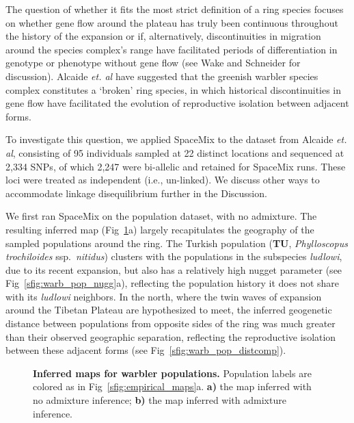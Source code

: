 \documentclass[10pt,letterpaper]{article}
\begin{document}
The question of whether it fits the most strict definition of a ring species focuses on whether gene flow around the plateau has truly been continuous throughout the history of the expansion or if, alternatively, discontinuities in migration around the species complex's range have facilitated periods of differentiation in genotype or phenotype without gene flow \cite{Mayr1942, Mayr1970, coyne_orr_speciation} (see Wake and Schneider \cite{wake_schneider1998} for discussion). 
Alcaide \emph{et. al} \cite{alcaide2014genomic} have suggested that the greenish warbler species complex constitutes a `broken' ring species, in which historical discontinuities in gene flow have facilitated the evolution of reproductive isolation between adjacent forms.  

To investigate this question, we applied SpaceMix to the dataset from Alcaide \emph{et. al}\cite{alcaide2014genomic}, 
consisting of 95 individuals sampled at 22 distinct locations and sequenced at 2,334 SNPs, of which 2,247 were bi-allelic and retained for SpaceMix runs.  These loci were treated as independent (i.e., un-linked).  We discuss other ways to accommodate linkage disequilibrium further in the Discussion.

We first ran SpaceMix on the population dataset, with no admixture. The resulting inferred map (Fig\ \ref{sfig:warbler_pop}a) largely recapitulates the geography of the sampled populations around the ring.  The Turkish population (\textbf{TU}, \textit{Phylloscopus trochiloides} ssp.\ \textit{nitidus}) clusters with the populations in the subspecies \textit{ludlowi}, due to its recent expansion, but also has a relatively high nugget parameter (see Fig\ \ref{sfig:warb_pop_nugg}a), reflecting the population history it does not share with its \textit{ludlowi} neighbors.  In the north, where the twin waves of expansion around the Tibetan Plateau are hypothesized to meet, the inferred geogenetic distance between populations from opposite sides of the ring was much greater than their observed geographic separation, reflecting the reproductive isolation between these adjacent forms (see Fig\ \ref{sfig:warb_pop_distcomp}).  
%
\begin{figure}[ht!]
\begin{center}
\end{center}
\caption{
\textbf{Inferred maps for warbler populations.}
Population labels are colored as in Fig\ \ref{sfig:empirical_maps}a. 
	\textbf{a)} 
	the map inferred with no admixture inference; 
	\textbf{b)}
	the map inferred with admixture inference.
}\label{sfig:warbler_pop}
\end{figure}
\end{document}
